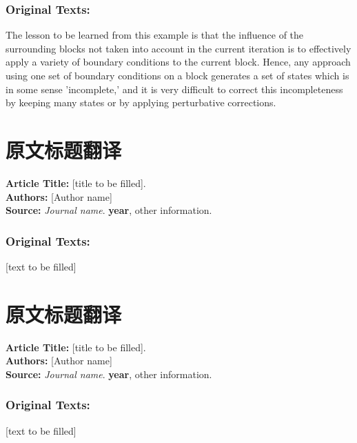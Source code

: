 \documentclass[type=proposal]{wuthesis}
\begin{document}
\subsubsection{Original Texts:}

The lesson to be learned from this example is that the influence of the surrounding blocks not taken into account in the current iteration is to effectively apply a variety of boundary conditions to the current block. Hence, any approach using one set of boundary conditions on a block generates a set of states which is in some sense 'incomplete,' and it is very difficult to correct this incompleteness by keeping many states or by applying perturbative corrections.
\section{原文标题翻译}
\noindent \textbf{Article Title:} [title to be filled].\\
\noindent \textbf{Authors:} [Author name]\\
\noindent \textbf{Source:} \textit{Journal name}. \textbf{year}, other information.

\subsubsection{Original Texts:}
[text to be filled]
\section{原文标题翻译}
\noindent \textbf{Article Title:} [title to be filled].\\
\noindent \textbf{Authors:} [Author name]\\
\noindent \textbf{Source:} \textit{Journal name}. \textbf{year}, other information.

\subsubsection{Original Texts:}
[text to be filled]
\end{document}
